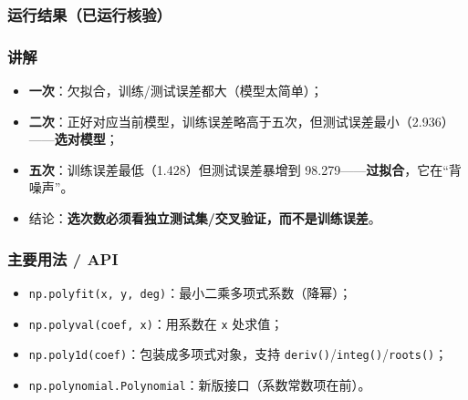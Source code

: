\subsubsection{运行结果（已运行核验）}\label{ux8fd0ux884cux7ed3ux679cux5df2ux8fd0ux884cux6838ux9a8c-8}

\begin{Shaded}
\begin{Highlighting}[]
\end{Highlighting}
\end{Shaded}

\subsubsection{讲解}\label{ux8bb2ux89e3-8}

\begin{itemize}
\tightlist
\item
  \textbf{一次}：欠拟合，训练/测试误差都大（模型太简单）；
\item
  \textbf{二次}：正好对应当前模型，训练误差略高于五次，但测试误差最小（2.936）------\textbf{选对模型}；
\item
  \textbf{五次}：训练误差最低（1.428）但测试误差暴增到
  98.279------\textbf{过拟合}，它在``背噪声''。
\item
  结论：\textbf{选次数必须看独立测试集/交叉验证，而不是训练误差}。
\end{itemize}

\subsubsection{主要用法 / API}\label{ux4e3bux8981ux7528ux6cd5-api-8}

\begin{itemize}
\tightlist
\item
  \texttt{np.polyfit(x,\ y,\ deg)}：最小二乘多项式系数（降幂）；
\item
  \texttt{np.polyval(coef,\ x)}：用系数在 \texttt{x} 处求值；
\item
  \texttt{np.poly1d(coef)}：包装成多项式对象，支持
  \texttt{deriv()}/\texttt{integ()}/\texttt{roots()}；
\item
  \texttt{np.polynomial.Polynomial}：新版接口（系数常数项在前）。
\end{itemize}

